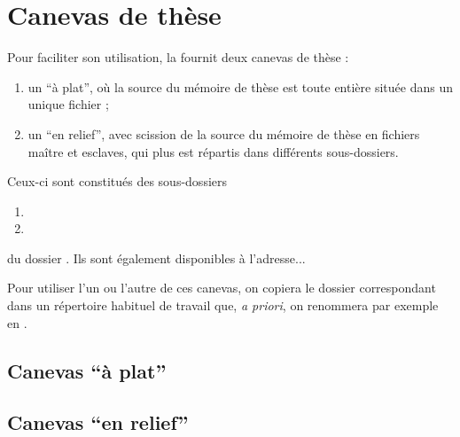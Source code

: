 \chapter{Canevas de thèse}\label{cha:canevas}

Pour faciliter son utilisation, la \yatcl fournit deux canevas de thèse :
\begin{enumerate}
\item un \enquote{à plat}, où la source  du mémoire de thèse est
  toute entière située dans un unique fichier ;
\item un \enquote{en relief}, avec scission de la source  du mémoire
  de thèse en fichiers maître et esclaves, qui plus est répartis dans
  différents sous-dossiers.
\end{enumerate}
Ceux-ci sont constitués des sous-dossiers
\begin{enumerate}
\item {}
\item {}
\end{enumerate}
du dossier . Ils sont également
disponibles à l'adresse...

Pour utiliser l'un ou l'autre de ces canevas, on copiera le dossier
correspondant dans un répertoire habituel de travail que, \emph{a
  priori}, on renommera par exemple en .

\section{Canevas  \enquote{à plat}}
\label{sec:canevas-a-plat}

\section{Canevas \enquote{en relief}}
\label{sec:canevas-relief}

%
\iffalse
\fi
